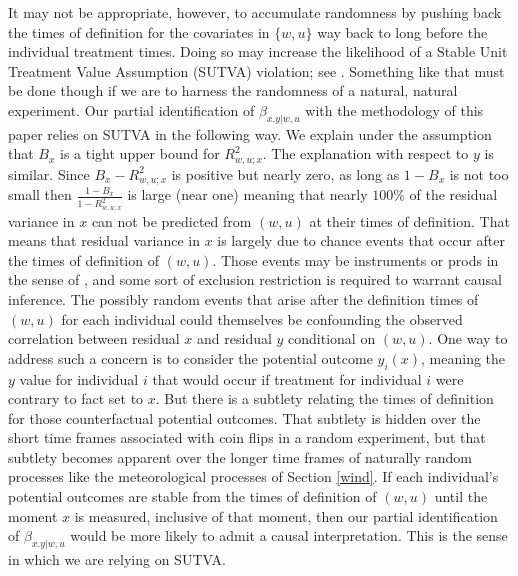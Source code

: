 \documentclass[11pt]{amsart}
\begin{document}
It may not be appropriate, however, to accumulate randomness by pushing back the times of definition for the covariates in $\{w,u\}$ way back to long before the individual treatment times. Doing so may increase the likelihood of a Stable Unit Treatment Value Assumption (SUTVA) violation; see \citep{Imbens2015}. Something like that must be done though if we are to harness the randomness of a natural, natural experiment. Our partial identification of $\beta_{x.y|w,u}$ with the methodology of this paper relies on SUTVA in the following way. We explain under the assumption that $B_x$ is a tight upper bound for $R^2_{w,u;x}$. The explanation with respect to $y$ is similar. Since $B_x-R^2_{w,u;x}$ is positive but nearly zero, as long as $1-B_x$ is not too small then $\frac{1-B_x}{1-R^2_{w,u;x}}$ is large (near one) meaning that nearly $100\%$ of the residual variance in $x$ can not be predicted from $(w,u)$ at their times of definition. That means that residual variance in $x$ is largely due to chance events that occur after the times of definition of $(w,u)$. Those events may be instruments or prods in the sense of \cite{Pim}, and some sort of exclusion restriction \citep{Imbens2015} is required to warrant causal inference. The possibly random events that arise after the definition times of $(w,u)$ for each individual could themselves be confounding the observed correlation between residual $x$ and residual $y$ conditional on $(w,u)$. One way to address such a concern is to consider the potential outcome $y_i(x)$, meaning the $y$ value for individual $i$ that would occur if treatment for individual $i$ were contrary to fact set to $x$. But there is a subtlety relating the times of definition for those counterfactual potential outcomes. That subtlety is hidden over the short time frames associated with coin flips in a random experiment, but that subtlety becomes apparent over the longer time frames of naturally random processes like the meteorological processes of Section \ref{wind}. If each individual's potential outcomes are stable from the times of definition of $(w,u)$ until the moment $x$ is measured, inclusive of that moment, then our partial identification of $\beta_{x.y|w,u}$ would be more likely to admit a causal interpretation. This is the sense in which we are relying on SUTVA. 
\end{document}
